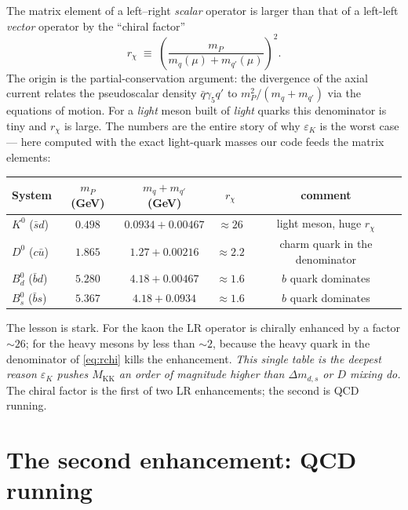 \documentclass[11pt]{article}
\newcommand{\MKK}{M_{\mathrm{KK}}}
\newcommand{\eps}{\varepsilon}
\theoremstyle{definition}
\begin{document}
The matrix element of a left--right \emph{scalar} operator is larger than that of
a left-left \emph{vector} operator by the ``chiral factor''
\begin{equation}
r_\chi \;\equiv\; \left(\frac{m_P}{m_q(\mu)+m_{q'}(\mu)}\right)^2 .
\label{eq:rchi}
\end{equation}
The origin is the partial-conservation argument: the divergence of the
axial current relates the pseudoscalar density $\bar q\gamma_5 q'$ to
$m_P^2/(m_q+m_{q'})$ via the equations of motion. For a \emph{light} meson built
of \emph{light} quarks this denominator is tiny and $r_\chi$ is large. The numbers
are the entire story of why $\eps_K$ is the worst case --- here computed with the
exact light-quark masses our code feeds the matrix elements:
\begin{center}
\begin{tabular}{lcccc}
\toprule
System & $m_P$ (GeV) & $m_q+m_{q'}$ (GeV) & $r_\chi$ & comment \\
\midrule
$K^0$ ($\bar s d$)  & $0.498$ & $0.0934+0.00467$ & $\approx 26$ & light meson, huge $r_\chi$ \\
$D^0$ ($c\bar u$)   & $1.865$ & $1.27+0.00216$   & $\approx 2.2$ & charm quark in the denominator \\
$B_d^0$ ($\bar b d$)& $5.280$ & $4.18+0.00467$   & $\approx 1.6$ & $b$ quark dominates \\
$B_s^0$ ($\bar b s$)& $5.367$ & $4.18+0.0934$    & $\approx 1.6$ & $b$ quark dominates \\
\bottomrule
\end{tabular}
\end{center}
The lesson is stark. For the kaon the LR operator is chirally enhanced by a factor
$\sim26$; for the heavy mesons by less than $\sim2$, because the heavy quark in
the denominator of \eqref{eq:rchi} kills the enhancement. \emph{This single table
is the deepest reason $\eps_K$ pushes $\MKK$ an order of magnitude higher than
$\Delta m_{d,s}$ or $D$ mixing do.} The chiral factor is the first of two LR
enhancements; the second is QCD running.

\section{The second enhancement: QCD running}
\label{sec:running}
\end{document}

